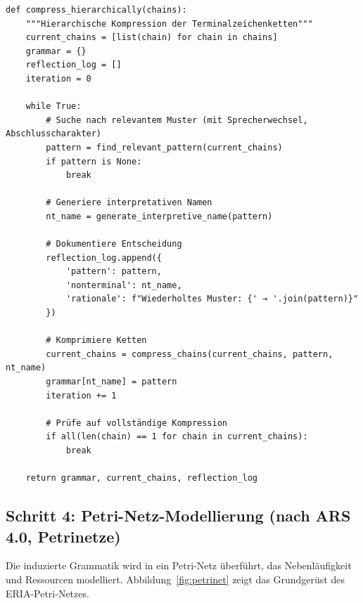 \documentclass[12pt,a4paper]{article}
\begin{document}
\begin{lstlisting}[caption=Hierarchische Kompression in ERIA]
def compress_hierarchically(chains):
    """Hierarchische Kompression der Terminalzeichenketten"""
    current_chains = [list(chain) for chain in chains]
    grammar = {}
    reflection_log = []
    iteration = 0
    
    while True:
        # Suche nach relevantem Muster (mit Sprecherwechsel, Abschlusscharakter)
        pattern = find_relevant_pattern(current_chains)
        if pattern is None:
            break
        
        # Generiere interpretativen Namen
        nt_name = generate_interpretive_name(pattern)
        
        # Dokumentiere Entscheidung
        reflection_log.append({
            'pattern': pattern,
            'nonterminal': nt_name,
            'rationale': f"Wiederholtes Muster: {' → '.join(pattern)}"
        })
        
        # Komprimiere Ketten
        current_chains = compress_chains(current_chains, pattern, nt_name)
        grammar[nt_name] = pattern
        iteration += 1
        
        # Prüfe auf vollständige Kompression
        if all(len(chain) == 1 for chain in current_chains):
            break
    
    return grammar, current_chains, reflection_log
\end{lstlisting}

\subsection{Schritt 4: Petri-Netz-Modellierung (nach ARS 4.0, Petrinetze)}

Die induzierte Grammatik wird in ein Petri-Netz überführt, das Nebenläufigkeit 
und Ressourcen modelliert. Abbildung~\ref{fig:petrinet} zeigt das Grundgerüst 
des ERIA-Petri-Netzes.
\end{document}
